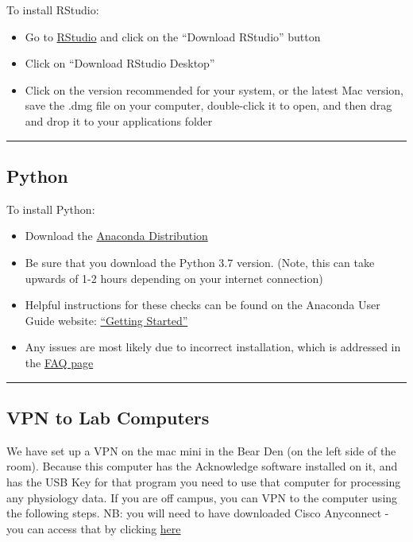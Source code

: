 \documentclass[
]{book}
\providecommand{\tightlist}{%
  \setlength{\itemsep}{0pt}\setlength{\parskip}{0pt}}
\begin{document}
To install RStudio:

\begin{itemize}
\tightlist
\item
  Go to \href{http://www.rstudio.com}{RStudio} and click on the ``Download RStudio'' button
\item
  Click on ``Download RStudio Desktop''
\item
  Click on the version recommended for your system, or the latest Mac version, save the .dmg file on your computer, double-click it to open, and then drag and drop it to your applications folder
\end{itemize}

\begin{center}\rule{0.5\linewidth}{0.5pt}\end{center}

\hypertarget{python}{%
\subsection{Python}\label{python}}

To install Python:

\begin{itemize}
\tightlist
\item
  Download the \href{https://www.anaconda.com/distribution/}{Anaconda Distribution}
\item
  Be sure that you download the Python 3.7 version. (Note, this can take upwards of 1-2 hours depending on your internet connection)
\item
  Helpful instructions for these checks can be found on the Anaconda User Guide website: \href{https://docs.anaconda.com/anaconda/user-guide/getting-started/}{``Getting Started''}
\item
  Any issues are most likely due to incorrect installation, which is addressed in the \href{https://docs.anaconda.com/anaconda/user-guide/faq/}{FAQ page}
\end{itemize}

\begin{center}\rule{0.5\linewidth}{0.5pt}\end{center}

\hypertarget{vpn-to-lab-computers}{%
\subsection{VPN to Lab Computers}\label{vpn-to-lab-computers}}

We have set up a VPN on the mac mini in the Bear Den (on the left side of the room).
Because this computer has the Acknowledge software installed on it, and has the USB Key for that program you need to use that computer for processing any physiology data. If you are off campus, you can VPN to the computer using the following steps. NB: you will need to have downloaded Cisco Anyconnect - you can access that by clicking \href{https://www.it.ucla.edu/it-support-center/services/virtual-private-network-vpn-clients}{here}
\end{document}
